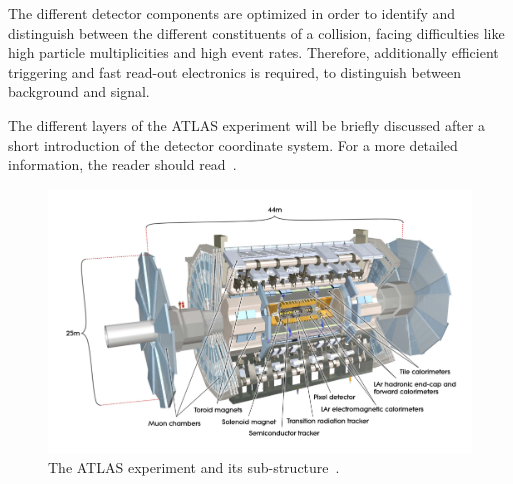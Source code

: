  The different detector components are optimized in order to identify and distinguish between the different constituents of a collision, facing difficulties like high particle multiplicities and high event rates. Therefore,  additionally  efficient triggering and fast read-out electronics is required, to distinguish between background and signal.

The different layers of the ATLAS experiment will be briefly discussed after a short introduction of the detector coordinate system. For a more detailed information, the reader should read~\cite{Aad:2008zzm,ATLAS:1999uwa}.   


\begin{figure}[t]
	\centering
	\includegraphics[width=1.0\linewidth]{Pics/cp3/33}
	\caption{The ATLAS experiment and its sub-structure~\cite{Aad:2008zzm}.} 
	\label{fig:33}
\end{figure}



